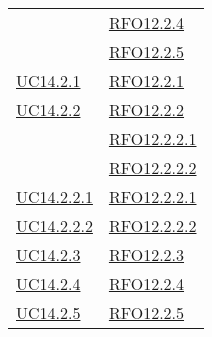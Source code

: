 \begin{longtable}{|>{\centering}m{5cm}|m{5cm}<{\centering}|}
& \hyperlink{RFO12.2.4}{RFO12.2.4}\\
& \hyperlink{RFO12.2.5}{RFO12.2.5}\\\hline
\hyperlink{UC14.2.1}{UC14.2.1} & \hyperlink{RFO12.2.1}{RFO12.2.1}\\\hline
\hyperlink{UC14.2.2}{UC14.2.2} & \hyperlink{RFO12.2.2}{RFO12.2.2}\\
& \hyperlink{RFO12.2.2.1}{RFO12.2.2.1}\\
& \hyperlink{RFO12.2.2.2}{RFO12.2.2.2}\\\hline
\hyperlink{UC14.2.2.1}{UC14.2.2.1} & \hyperlink{RFO12.2.2.1}{RFO12.2.2.1}\\\hline
\hyperlink{UC14.2.2.2}{UC14.2.2.2} & \hyperlink{RFO12.2.2.2}{RFO12.2.2.2}\\\hline
\hyperlink{UC14.2.3}{UC14.2.3} & \hyperlink{RFO12.2.3}{RFO12.2.3}\\\hline
\hyperlink{UC14.2.4}{UC14.2.4} & \hyperlink{RFO12.2.4}{RFO12.2.4}\\\hline
\hyperlink{UC14.2.5}{UC14.2.5} & \hyperlink{RFO12.2.5}{RFO12.2.5}\\\hline
\end{longtable}